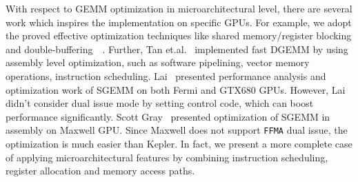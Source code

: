 With respect to GEMM optimization in microarchitectural level, there are several work which inspires the implementation on specific GPUs. For example, we adopt the proved effective optimization techniques like shared memory/register blocking and double-buffering~\cite{volkov}~\cite{tan}. Further, Tan et.al.~\cite{tan} implemented fast DGEMM by using assembly level optimization, such as software pipelining, vector memory operations, instruction scheduling. Lai~\cite{lai} presented performance analysis and optimization work of SGEMM on both Fermi and GTX680 GPUs. However, Lai didn't consider dual issue mode by setting control code, which can boost performance significantly. Scott Gray~\cite{nervana_sgemm_wiki} presented optimization of SGEMM in assembly on Maxwell GPU. Since Maxwell does not support {\tt FFMA} dual issue, the optimization is much easier than
Kepler. In fact, we present a more complete case of applying microarchitectural features by combining instruction scheduling, register allocation and memory access paths.
